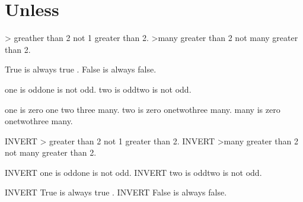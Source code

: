 \documentclass{article}
\begin{document}
\section{Unless}
\newcount\one{}\relax
\newcount\two{}\relax
\newcount\many{}\relax

\newif\ifalwaystrue\alwaystruetrue
\newif\ifalwaysfalse\alwaysfalsefalse

\ifnum\one> greather than 2 \else not 1 greater than 2\fi.
\ifnum\many>\two many greater than 2 \else not many greater than 2\fi.

True \ifalwaystrue is always true \else should never be false\fi.
False \ifalwaysfalse should never be true \else is always false\fi.

\ifodd\one one is odd\else one is not odd\fi.
\ifodd\two two is odd\else two is not odd\fi.

one is \ifcase\one zero \or one \or two \or three \else many\fi.
two is \ifcase\two zero \or one\or two\or three \else many\fi.
many is \ifcase\many zero \or one\or two\or three \else many\fi.


INVERT \unless\ifnum\one> greater than 2 \else not 1 greater than 2\fi.
INVERT \unless\ifnum\many>\two many greater than 2 \else not many greater than 2\fi.

INVERT \unless\ifodd\one one is odd\else one is not odd\fi.
INVERT \unless\ifodd\two two is odd\else two is not odd\fi.

INVERT True \unless\ifalwaystrue is always true \else should never be false\fi.
INVERT False \unless\ifalwaysfalse should never be true \else is always false\fi.

\end{document}
